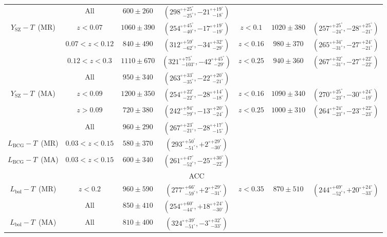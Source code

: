 \documentclass{aa}   %
\newcommand{\YT}{$Y_{\text{SZ}}-T$}
\newcommand{\LbcgT}{$L_{\text{BCG}}-T$}
\newcommand{\LbolT}{$L_{\text{bol}}-T$}
\begin{document}
\begin{table}[hbtp]
\begin{center}
\begin{tabular}{ c  c  c  c | c  c c }
&  All & $600\pm 260$ & $({298^{\circ}}^{+25^{\circ}}_{-25^{\circ}},{-21^{\circ}}^{+19^{\circ}}_{-18^{\circ}})$ &  &\\ 
\YT\ (MR)&  $z<0.07$ & $1060\pm 390$ & $({254^{\circ}}^{+45^{\circ}}_{-40^{\circ}},{-17^{\circ}}^{+19^{\circ}}_{-19^{\circ}})$ & $z<0.1$ & $1020\pm 380$  & $({257^{\circ}}^{+25^{\circ}}_{-24^{\circ}},{-28^{\circ}}^{+25^{\circ}}_{-21^{\circ}})$ \\ 
 &$0.07<z<0.12$ & $840\pm 490$ & $({312^{\circ}}^{+59^{\circ}}_{-62^{\circ}},{-34^{\circ}}^{+32^{\circ}}_{-29^{\circ}})$ & $z<0.16$ & $980\pm 370$  & $({265^{\circ}}^{+34^{\circ}}_{-31^{\circ}},{-27^{\circ}}^{+24^{\circ}}_{-21^{\circ}})$\\ 
&  $0.12<z<0.3$ & $1110\pm 670$ & $({321^{\circ}}^{+75^{\circ}}_{-103^{\circ}},{-42^{\circ}}^{+45^{\circ}}_{-29^{\circ}})$ & $z<0.25$ & $940\pm 360$ &  $({267^{\circ}}^{+32^{\circ}}_{-31^{\circ}},{-27^{\circ}}^{+22^{\circ}}_{-22^{\circ}})$\\ 
&  All & $950\pm 340$ & $({263^{\circ}}^{+33^{\circ}}_{-35^{\circ}},{-22^{\circ}}^{+20^{\circ}}_{-21^{\circ}})$ & & &\\ 
\YT\ (MA)&  $z<0.09$ & $1200\pm 350$ & $({254^{\circ}}^{+22^{\circ}}_{-22^{\circ}},{-28^{\circ}}^{+14^{\circ}}_{-18^{\circ}})$ & $z<0.16$ & $1090\pm 340$ & $({270^{\circ}}^{+25^{\circ}}_{-23^{\circ}},{-30^{\circ}}^{+24^{\circ}}_{-19^{\circ}})$\\ 
 &$z>0.09$ & $720\pm 380$ & $({242^{\circ}}^{+94^{\circ}}_{-79^{\circ}},{-13^{\circ}}^{+20^{\circ}}_{-24^{\circ}})$ & $z<0.25$  & $1000\pm 310$ & $({264^{\circ}}^{+24^{\circ}}_{-23^{\circ}},{-23^{\circ}}^{+22^{\circ}}_{-23^{\circ}})$\\ 
&  All & $960\pm 290$ & $({267^{\circ}}^{+23^{\circ}}_{-21^{\circ}},{-28^{\circ}}^{+17^{\circ}}_{-15^{\circ}})$ &  &\\ 
\LbcgT\ (MR)&  $0.03<z<0.15$ & $580\pm 370$ & $({293^{\circ}}^{+50^{\circ}}_{-51^{\circ}},{+2^{\circ}}^{+29^{\circ}}_{-30^{\circ}})$ & &   &  \\ 

\LbcgT\ (MA)&  $0.03<z<0.15$ & $600\pm 340$ & $({261^{\circ}}^{+47^{\circ}}_{-52^{\circ}},{-25^{\circ}}^{+30^{\circ}}_{-22^{\circ}})$ &  &  & \\ 



\hline
&  & & ACC & & \\ \hline
\LbolT\ (MR)&  $z<0.2$ & $960\pm 590$ & $({277^{\circ}}^{+66^{\circ}}_{-59^{\circ}},{+2^{\circ}}^{+29^{\circ}}_{-31^{\circ}})$ & $z<0.35$ & $870\pm 510$  & $({244^{\circ}}^{+69^{\circ}}_{-52^{\circ}},{+20^{\circ}}^{+24^{\circ}}_{-33^{\circ}})$ \\ 
&  All & $850\pm 410$ & $({254^{\circ}}^{+60^{\circ}}_{-44^{\circ}},{+18^{\circ}}^{+24^{\circ}}_{-30^{\circ}})$ & & &\\ 
\LbolT\ (MA)&  All & $810\pm 400$ & $({324^{\circ}}^{+39^{\circ}}_{-51^{\circ}},{-3^{\circ}}^{+32^{\circ}}_{-33^{\circ}})$ & &  &\\ 


\end{tabular}
\end{center}
\end{table}
\end{document}
